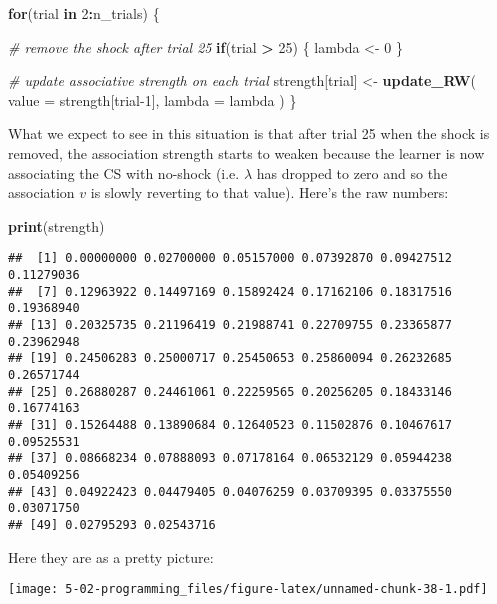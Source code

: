 \documentclass[]{book}
\newenvironment{Shaded}{\begin{snugshade}}{\end{snugshade}}
\newcommand{\CommentTok}[1]{\textcolor[rgb]{0.56,0.35,0.01}{\textit{#1}}}
\newcommand{\ControlFlowTok}[1]{\textcolor[rgb]{0.13,0.29,0.53}{\textbf{#1}}}
\newcommand{\DataTypeTok}[1]{\textcolor[rgb]{0.13,0.29,0.53}{#1}}
\newcommand{\DecValTok}[1]{\textcolor[rgb]{0.00,0.00,0.81}{#1}}
\newcommand{\KeywordTok}[1]{\textcolor[rgb]{0.13,0.29,0.53}{\textbf{#1}}}
\newcommand{\NormalTok}[1]{#1}
\newcommand{\OperatorTok}[1]{\textcolor[rgb]{0.81,0.36,0.00}{\textbf{#1}}}
\newcommand{\StringTok}[1]{\textcolor[rgb]{0.31,0.60,0.02}{#1}}
\begin{document}
\begin{Shaded}
\begin{Highlighting}[]
\ControlFlowTok{for}\NormalTok{(trial }\ControlFlowTok{in} \DecValTok{2}\OperatorTok{:}\NormalTok{n_trials) \{}
  
  \CommentTok{# remove the shock after trial 25}
  \ControlFlowTok{if}\NormalTok{(trial }\OperatorTok{>}\StringTok{ }\DecValTok{25}\NormalTok{) \{}
\NormalTok{    lambda <-}\StringTok{ }\DecValTok{0}
\NormalTok{  \}}
  
  \CommentTok{# update associative strength on each trial}
\NormalTok{  strength[trial] <-}\StringTok{ }\KeywordTok{update_RW}\NormalTok{(}
    \DataTypeTok{value =}\NormalTok{ strength[trial}\DecValTok{-1}\NormalTok{],}
    \DataTypeTok{lambda =}\NormalTok{ lambda}
\NormalTok{  )}
\NormalTok{\}}
\end{Highlighting}
\end{Shaded}

What we expect to see in this situation is that after trial 25 when the shock is removed, the association strength starts to weaken because the learner is now associating the CS with no-shock (i.e. \(\lambda\) has dropped to zero and so the association \(v\) is slowly reverting to that value). Here's the raw numbers:

\begin{Shaded}
\begin{Highlighting}[]
\KeywordTok{print}\NormalTok{(strength)}
\end{Highlighting}
\end{Shaded}

\begin{verbatim}
##  [1] 0.00000000 0.02700000 0.05157000 0.07392870 0.09427512 0.11279036
##  [7] 0.12963922 0.14497169 0.15892424 0.17162106 0.18317516 0.19368940
## [13] 0.20325735 0.21196419 0.21988741 0.22709755 0.23365877 0.23962948
## [19] 0.24506283 0.25000717 0.25450653 0.25860094 0.26232685 0.26571744
## [25] 0.26880287 0.24461061 0.22259565 0.20256205 0.18433146 0.16774163
## [31] 0.15264488 0.13890684 0.12640523 0.11502876 0.10467617 0.09525531
## [37] 0.08668234 0.07888093 0.07178164 0.06532129 0.05944238 0.05409256
## [43] 0.04922423 0.04479405 0.04076259 0.03709395 0.03375550 0.03071750
## [49] 0.02795293 0.02543716
\end{verbatim}

Here they are as a pretty picture:

\texttt{[image: 5-02-programming\_files/figure-latex/unnamed-chunk-38-1.pdf]}
\end{document}

